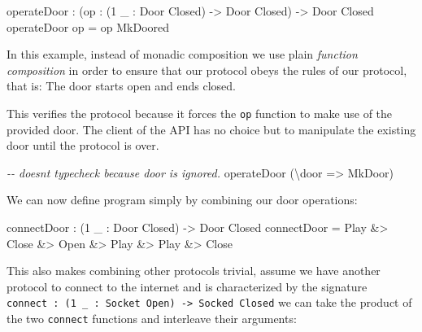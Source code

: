 \documentclass[
]{article}
\newenvironment{Shaded}{}{}
\newcommand{\CommentTok}[1]{\textcolor[rgb]{0.38,0.63,0.69}{\textit{#1}}}
\newcommand{\DataTypeTok}[1]{\textcolor[rgb]{0.56,0.13,0.00}{#1}}
\newcommand{\DecValTok}[1]{\textcolor[rgb]{0.25,0.63,0.44}{#1}}
\newcommand{\NormalTok}[1]{#1}
\newcommand{\OperatorTok}[1]{\textcolor[rgb]{0.40,0.40,0.40}{#1}}
\newcommand{\OtherTok}[1]{\textcolor[rgb]{0.00,0.44,0.13}{#1}}
\begin{document}
\begin{Shaded}
\begin{Highlighting}[]
\NormalTok{operateDoor }\OperatorTok{:}\NormalTok{ (op }\OperatorTok{:}\NormalTok{ (}\DecValTok{1}\NormalTok{ \_ }\OperatorTok{:} \DataTypeTok{Door} \DataTypeTok{Closed}\NormalTok{) }\OtherTok{{-}\textgreater{}} \DataTypeTok{Door} \DataTypeTok{Closed}\NormalTok{)}
           \OtherTok{{-}\textgreater{}} \DataTypeTok{Door} \DataTypeTok{Closed}
\NormalTok{operateDoor op }\OtherTok{=}\NormalTok{ op }\DataTypeTok{MkDoored}
\end{Highlighting}
\end{Shaded}

In this example, instead of monadic composition we use plain
\emph{function composition} in order to ensure that our protocol obeys
the rules of our protocol, that is: The door starts open and ends
closed.

This verifies the protocol because it forces the \texttt{op} function to
make use of the provided door. The client of the API has no choice but
to manipulate the existing door until the protocol is over.

\begin{Shaded}
\begin{Highlighting}[]
\CommentTok{{-}{-} doesn\textquotesingle{}t typecheck because door is ignored.}
\NormalTok{operateDoor (\textbackslash{}door }\OtherTok{=\textgreater{}} \DataTypeTok{MkDoor}\NormalTok{) }
\end{Highlighting}
\end{Shaded}

We can now define program simply by combining our door operations:

\begin{Shaded}
\begin{Highlighting}[]
\NormalTok{connectDoor }\OperatorTok{:}\NormalTok{ (}\DecValTok{1}\NormalTok{ \_ }\OperatorTok{:} \DataTypeTok{Door} \DataTypeTok{Closed}\NormalTok{) }\OtherTok{{-}\textgreater{}} \DataTypeTok{Door} \DataTypeTok{Closed}
\NormalTok{connectDoor }\OtherTok{=} \DataTypeTok{Play} \OperatorTok{\&\textgreater{}} \DataTypeTok{Close} \OperatorTok{\&\textgreater{}} \DataTypeTok{Open} \OperatorTok{\&\textgreater{}} \DataTypeTok{Play} \OperatorTok{\&\textgreater{}} \DataTypeTok{Play} \OperatorTok{\&\textgreater{}} \DataTypeTok{Close}
\end{Highlighting}
\end{Shaded}

This also makes combining other protocols trivial, assume we have
another protocol to connect to the internet and is characterized by the
signature
\texttt{connect\ :\ (1\ \_\ :\ Socket\ Open)\ -\textgreater{}\ Socked\ Closed}
we can take the product of the two \texttt{connect} functions and
interleave their arguments:
\end{document}
